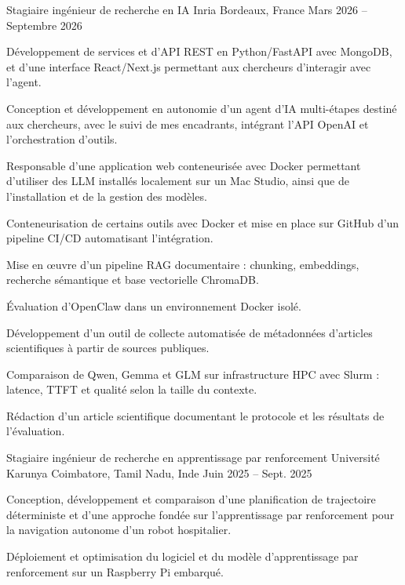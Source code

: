 
\begin{cventries}
  \cventry
    {Stagiaire ingénieur de recherche en IA}
    {Inria}
    {Bordeaux, France}
    {Mars 2026 -- Septembre 2026}
    {
      \begin{cvitems}
        \item {Développement de services et d’API REST en Python/FastAPI avec MongoDB, et d’une interface React/Next.js permettant aux chercheurs d’interagir avec l’agent.}
        \item {Conception et développement en autonomie d’un agent d’IA multi-étapes destiné aux chercheurs, avec le suivi de mes encadrants, intégrant l’API OpenAI et l’orchestration d’outils.}
        \item {Responsable d’une application web conteneurisée avec Docker permettant d’utiliser des LLM installés localement sur un Mac Studio, ainsi que de l’installation et de la gestion des modèles.}
        \item {Conteneurisation de certains outils avec Docker et mise en place sur GitHub d’un pipeline CI/CD automatisant l’intégration.}
        \item {Mise en œuvre d’un pipeline RAG documentaire : chunking, embeddings, recherche sémantique et base vectorielle ChromaDB.}
        \item {Évaluation d’OpenClaw dans un environnement Docker isolé.}
        \item {Développement d’un outil de collecte automatisée de métadonnées d’articles scientifiques à partir de sources publiques.}
        \item {Comparaison de Qwen, Gemma et GLM sur infrastructure HPC avec Slurm : latence, TTFT et qualité selon la taille du contexte.}
        \item {Rédaction d’un article scientifique documentant le protocole et les résultats de l’évaluation.}
      \end{cvitems}
    }

  \cventry
    {Stagiaire ingénieur de recherche en apprentissage par renforcement}
    {Université Karunya}
    {Coimbatore, Tamil Nadu, Inde}
    {Juin 2025 -- Sept. 2025}
    {
      \begin{cvitems}
        \item {Conception, développement et comparaison d’une planification de trajectoire déterministe et d’une approche fondée sur l’apprentissage par renforcement pour la navigation autonome d’un robot hospitalier.}
        \item {Déploiement et optimisation du logiciel et du modèle d’apprentissage par renforcement sur un Raspberry Pi embarqué.}
      \end{cvitems}
    }
\end{cventries}
